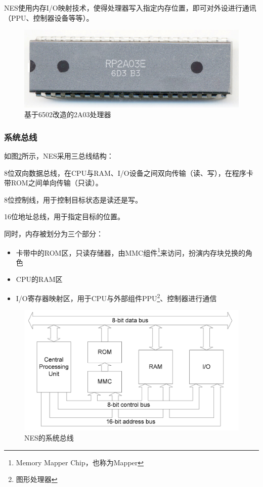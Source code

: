 \documentclass[a4paper]{ltxdoc}
\begin{document}
{NES使用内存I/O映射技术，使得处理器写入指定内存位置，即可对外设进行通讯（PPU、控制器设备等等）。

\begin{figure}[h]
	\centering
	\includegraphics{images/RP2A03E.jpg}
	\caption{基于6502改造的2A03处理器}
	\label{fig:2a03}
\end{figure}

\subsubsection{系统总线}
如图\ref{fig:system_bus}所示，NES采用三总线结构：
\begin{description}[align=left]
	\item [数据总线] 8位双向数据总线，在CPU与RAM、I/O设备之间双向传输（读、写），在程序卡带ROM之间单向传输（只读）。
	\item [控制总线] 8位控制线，用于控制目标状态是读还是写。
	\item [地址总线] 16位地址总线，用于指定目标的位置。
\end{description}

同时，内存被划分为三个部分：
\begin{itemize}
	\item 卡带中的ROM区，只读存储器，由MMC组件\footnote{Memory Mapper Chip，也称为Mapper}来访问，扮演内存块兑换的角色
	\item CPU的RAM区
	\item I/O寄存器映射区，用于CPU与外部组件PPU\footnote{图形处理器}、控制器进行通信
\end{itemize}

\begin{figure}[h]
	\centering
	\includegraphics[width=\textwidth]{images/system_bus.png}
	\caption{NES的系统总线}
	\label{fig:system_bus}
\end{figure}

}
\end{document}
